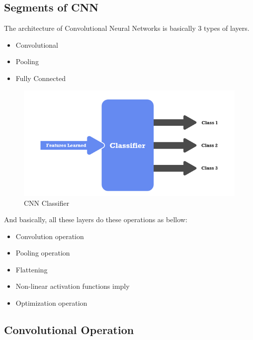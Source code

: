 \newpage
\subsection{Segments of CNN}

\vspace{5mm}
The architecture of Convolutional Neural Networks is basically 3 types of layers.

\begin{itemize}
    \item Convolutional
    \item Pooling
    \item Fully Connected
\end{itemize}

\vspace{5mm}
\begin{figure}[hbt!]
\centering
\includegraphics[scale=1]{images/fig-17.png}
\caption{CNN Classifier}
\label{fig:x CNN Classifier}
\end{figure}

And basically, all these layers do these operations as bellow:

\vspace{5mm}
\begin{itemize}
    \item Convolution operation
    \item Pooling operation
    \item Flattening
    \item Non-linear activation functions imply
    \item Optimization operation
\end{itemize}

\vspace{5mm}
\subsection{Convolutional Operation}


